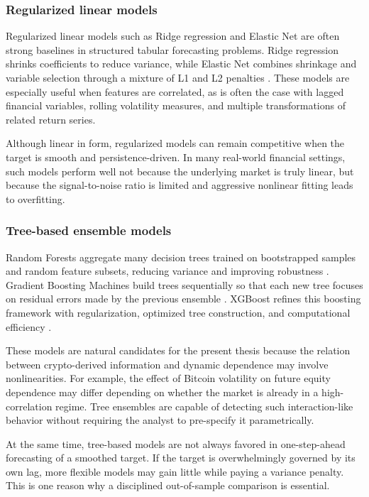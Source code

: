 \subsubsection{Regularized linear models}

Regularized linear models such as Ridge regression and Elastic Net are often strong baselines in structured tabular forecasting problems. Ridge regression shrinks coefficients to reduce variance, while Elastic Net combines shrinkage and variable selection through a mixture of L1 and L2 penalties \cite{zou2005}. These models are especially useful when features are correlated, as is often the case with lagged financial variables, rolling volatility measures, and multiple transformations of related return series.

Although linear in form, regularized models can remain competitive when the target is smooth and persistence-driven. In many real-world financial settings, such models perform well not because the underlying market is truly linear, but because the signal-to-noise ratio is limited and aggressive nonlinear fitting leads to overfitting.

\subsubsection{Tree-based ensemble models}

Random Forests aggregate many decision trees trained on bootstrapped samples and random feature subsets, reducing variance and improving robustness \cite{breiman2001}. Gradient Boosting Machines build trees sequentially so that each new tree focuses on residual errors made by the previous ensemble \cite{friedman2001}. XGBoost refines this boosting framework with regularization, optimized tree construction, and computational efficiency \cite{chen2016}.

These models are natural candidates for the present thesis because the relation between crypto-derived information and dynamic dependence may involve nonlinearities. For example, the effect of Bitcoin volatility on future equity dependence may differ depending on whether the market is already in a high-correlation regime. Tree ensembles are capable of detecting such interaction-like behavior without requiring the analyst to pre-specify it parametrically.

At the same time, tree-based models are not always favored in one-step-ahead forecasting of a smoothed target. If the target is overwhelmingly governed by its own lag, more flexible models may gain little while paying a variance penalty. This is one reason why a disciplined out-of-sample comparison is essential.

